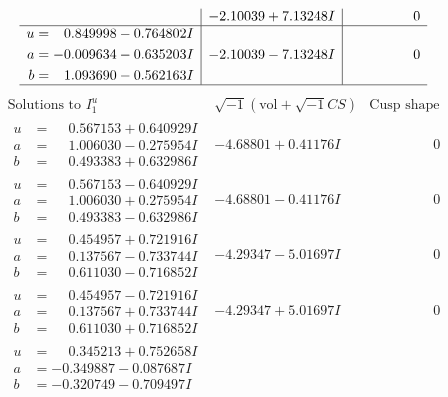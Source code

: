 \documentclass[1p]{elsarticle_modified}
\theoremstyle{definition}
\newcommand{\I}{\sqrt{-1}}
\begin{document}
$$\begin{array}{c|c|c}
 & -2.10039 + 7.13248 I & \phantom{-0.000000 } 0 \\ \hline\begin{aligned}
u &= \phantom{-}0.849998 - 0.764802 I \\
a &= -0.009634 - 0.635203 I \\
b &= \phantom{-}1.093690 - 0.562163 I\end{aligned}
 & -2.10039 - 7.13248 I & \phantom{-0.000000 } 0\\
 \hline 
 \end{array}$$\newpage$$\begin{array}{c|c|c}  
\text{Solutions to }I^u_{1}& \I (\text{vol} + \sqrt{-1}CS) & \text{Cusp shape}\\
 \hline 
\begin{aligned}
u &= \phantom{-}0.567153 + 0.640929 I \\
a &= \phantom{-}1.006030 - 0.275954 I \\
b &= \phantom{-}0.493383 + 0.632986 I\end{aligned}
 & -4.68801 + 0.41176 I & \phantom{-0.000000 } 0 \\ \hline\begin{aligned}
u &= \phantom{-}0.567153 - 0.640929 I \\
a &= \phantom{-}1.006030 + 0.275954 I \\
b &= \phantom{-}0.493383 - 0.632986 I\end{aligned}
 & -4.68801 - 0.41176 I & \phantom{-0.000000 } 0 \\ \hline\begin{aligned}
u &= \phantom{-}0.454957 + 0.721916 I \\
a &= \phantom{-}0.137567 - 0.733744 I \\
b &= \phantom{-}0.611030 - 0.716852 I\end{aligned}
 & -4.29347 - 5.01697 I & \phantom{-0.000000 } 0 \\ \hline\begin{aligned}
u &= \phantom{-}0.454957 - 0.721916 I \\
a &= \phantom{-}0.137567 + 0.733744 I \\
b &= \phantom{-}0.611030 + 0.716852 I\end{aligned}
 & -4.29347 + 5.01697 I & \phantom{-0.000000 } 0 \\ \hline\begin{aligned}
u &= \phantom{-}0.345213 + 0.752658 I \\
a &= -0.349887 - 0.087687 I \\
b &= -0.320749 - 0.709497 I\end{aligned}

\end{array}$$
\end{document}

